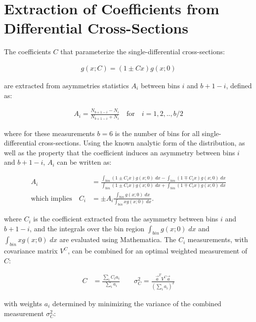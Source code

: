 \section{Extraction of Coefficients from Differential Cross-Sections}
\label{coefficient_extraction}
The coefficients $C$ that parameterize the single-differential cross-sections: 
\begin{linenomath*}
\begin{align}
g(x;C) = (1 \pm Cx)g(x;0)
\end{align}
\end{linenomath*}
are extracted from asymmetries statistics $A_i$ between bins $i$ and $b+1-i$, defined as:
\begin{linenomath*}
\begin{align}
A_i = \frac{N_{b+1-i} - N_i}{N_{b+1-i} + N_i} \quad \text{for} \quad i = 1,2,..,b/2
\end{align}
\end{linenomath*}
where for these measurements $b=6$ is the number of bins for all single-differential cross-sections.
Using the known analytic form of the distribution, as well as the property that the coefficient induces an asymmetry between bins $i$ and $b+1-i$, $A_i$ can be written as:
\begin{linenomath*}
\begin{align}
A_i &= \frac{\int_{bin} (1 \pm C_i x)g(x;0) \; dx  - \int_{bin} (1 \mp C_i x)g(x;0) \; dx}{\int_{bin} (1 \pm C_i x)g(x;0) \; dx  + \int_{bin} (1 \mp C_i x)g(x;0) \; dx} \\
\text{which implies} \quad C_i &= \pm A_i  \frac{\int_{bin} g(x;0) \; dx}{\int_{bin} x g(x;0) \; dx}.
\end{align}
\end{linenomath*}
where $C_i$ is the coefficient extracted from the asymmetry between bins $i$ and $b+1-i$, and the integrals over the bin region $\int_{bin} g(x;0) \; dx$ and $\int_{bin} x g(x;0) \; dx$ are evaluated using Mathematica.
The $C_i$ measurements, with covariance matrix $V^C$, can be combined for an optimal weighted measurement of $C$:
\begin{linenomath*}
\begin{align*}
C &= \frac{\sum_i C_i a_i}{\sum_i a_i} \quad \quad \sigma^2_C = \frac{\vec{a}^T V^C \vec{a}}{\left( \sum_i a_i \right)^2}
\end{align*}
\end{linenomath*}
with weights $a_i$ determined by minimizing the variance of the combined measurement $\sigma^2_C$:
